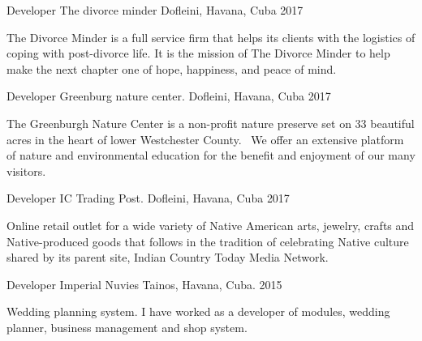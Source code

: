 \begin{cventries}

\cventry
{Developer} %
{The divorce minder} %
{Dofleini, Havana, Cuba} %
{2017} %
{ %
\begin{cvitems}
\item {The Divorce Minder is a full service firm that helps its clients with the logistics of coping with post-divorce life. It is the mission of The Divorce Minder to help make the next chapter one of hope, happiness, and peace of mind.}
\end{cvitems}
}


\cventry
{Developer} %
{Greenburg nature center.} %
{Dofleini, Havana, Cuba} %
{2017} %
{ %
\begin{cvitems}
\item {The Greenburgh Nature Center is a non-profit nature preserve set on 33 beautiful acres in the heart of lower Westchester County.  We offer an extensive platform of nature and environmental education for the benefit and enjoyment of our many visitors.}
\end{cvitems}
}


\cventry
{Developer} %
{IC Trading Post.} %
{Dofleini, Havana, Cuba} %
{2017} %
{ %
\begin{cvitems}
\item {Online retail outlet for a wide variety of Native American arts, jewelry, crafts and Native-produced goods that follows in the tradition of celebrating Native culture shared by its parent site, Indian Country Today Media Network.}
\end{cvitems}
}


\cventry
{Developer} %
{Imperial Nuvies} %
{Tainos, Havana, Cuba.} %
{2015} %
{ %
\begin{cvitems}
\item {Wedding planning system. I have worked as a developer of modules, wedding planner, business management and shop system.}
\end{cvitems}
}


\end{cventries}
